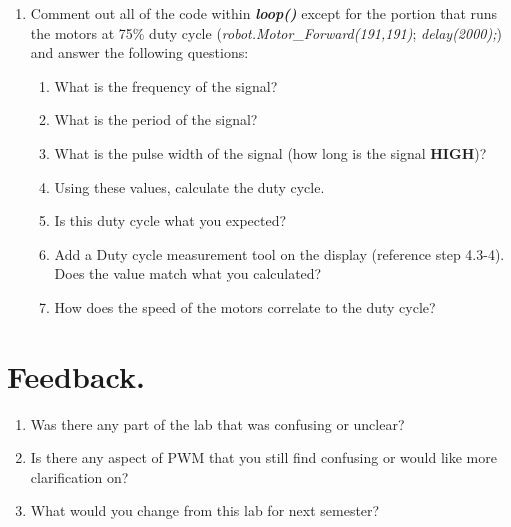 \documentclass{handout}
\begin{document}
\begin{enumerate}
	\newpage
\clearpage
\pagebreak


\item Comment out all of the code within \textbf{\textit{loop()}} except for the portion that runs the motors at 75\% duty cycle (\textit{robot.Motor\_Forward(191,191)}; \textit{delay(2000);}) and answer the following questions:
\begin{enumerate}
	\item What is the frequency of the signal? 
	\item What is the period of the signal? \soln{.3in}{}
	\item What is the pulse width of the signal (how long is the signal \textbf{HIGH})? \soln{.3in}{}
	\item Using these values, calculate the duty cycle. \soln{.3in}{}
	\item Is this duty cycle what you expected? \soln{.3in}{}
	\item Add a Duty cycle measurement tool on the display (reference step 4.3-4). Does the value match what you calculated?\soln{.3in}{}
	\item How does the speed of the motors correlate to the duty cycle? \soln{.3in}{}
	
\end{enumerate}
	\end{enumerate}
\section{Feedback.}
\begin{enumerate}
	\item Was there any part of the lab that was confusing or unclear? \soln{.3in}{}
	\item Is there any aspect of PWM that you still find confusing or would like more clarification on? \soln{.3in}{}
	\item What would you change from this lab for next semester? \soln{.3in}{}
\end{enumerate}
	
\end{document}
